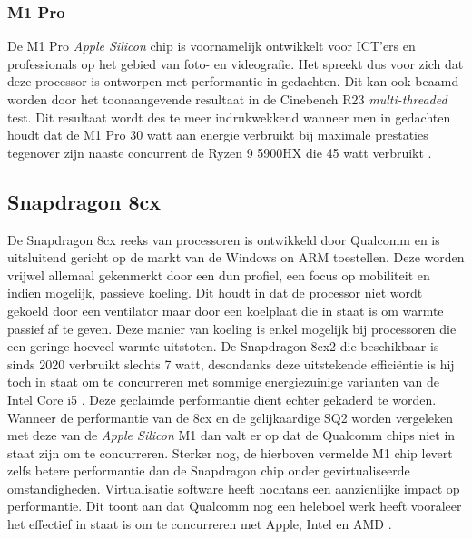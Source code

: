 \subsubsection{M1 Pro}
\raggedbottom
De M1 Pro \textit{Apple Silicon} chip is voornamelijk ontwikkelt voor ICT'ers en professionals op het gebied van foto- en videografie. Het spreekt dus voor zich dat deze processor is ontworpen met performantie in gedachten. Dit kan ook beaamd worden door het toonaangevende resultaat in de Cinebench R23 \textit{multi-threaded} test. Dit resultaat wordt des te meer indrukwekkend wanneer men in gedachten houdt dat de M1 Pro 30 watt aan energie verbruikt bij maximale prestaties tegenover zijn naaste concurrent de Ryzen 9 5900HX die 45 watt verbruikt \autocite{Schiesser2021}.

\subsection{Snapdragon 8cx}
\raggedbottom
De Snapdragon 8cx reeks van processoren is ontwikkeld door Qualcomm en is uitsluitend gericht op de markt van de Windows on ARM toestellen. Deze worden vrijwel allemaal gekenmerkt door een dun profiel, een focus op mobiliteit en indien mogelijk, passieve koeling. Dit houdt in dat de processor niet wordt gekoeld door een ventilator maar door een koelplaat die in staat is om warmte passief af te geven. Deze manier van koeling is enkel mogelijk bij processoren die een geringe hoeveel warmte uitstoten. De Snapdragon 8cx2 die beschikbaar is sinds 2020 verbruikt slechts 7 watt, desondanks deze uitstekende efficiëntie is hij toch in staat om te concurreren met sommige energiezuinige varianten van de Intel Core i5 \autocite{Qualcomm2020}. Deze geclaimde performantie dient echter gekaderd te worden. Wanneer de performantie van de 8cx en de gelijkaardige SQ2 worden vergeleken met deze van de \textit{Apple Silicon} M1 dan valt er op dat de Qualcomm chips niet in staat zijn om te concurreren. Sterker nog, de hierboven vermelde M1 chip levert zelfs betere performantie dan de Snapdragon chip onder gevirtualiseerde omstandigheden. Virtualisatie software heeft nochtans een aanzienlijke impact op performantie. Dit toont aan dat Qualcomm nog een heleboel werk heeft vooraleer het effectief in staat is om te concurreren met Apple, Intel en AMD \autocite{Wankhede2020}.

